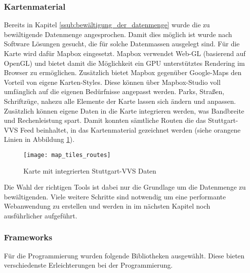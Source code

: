   \subsubsection{Kartenmaterial}
  \label{ssub:kartenmaterial}
    Bereits in Kapitel \ref{ssub:bewältigung_der_datenmenge} wurde die zu bewältigende Datenmenge angesprochen. Damit dies möglich ist wurde nach Software Lösungen gesucht, die für solche Datenmassen ausgelegt sind. Für die Karte wird dafür Mapbox eingesetzt. Mapbox verwendet Web-GL (basierend auf OpenGL) und bietet damit die Möglichkeit ein GPU unterstütztes Rendering im Browser zu ermöglichen. Zusätzlich bietet Mapbox gegenüber Google-Maps den Vorteil von eigene Karten-Styles. Diese können über Mapbox-Studio voll umfänglich auf die eigenen Bedürfnisse angepasst werden. Parks, Straßen, Schriftzüge, nahezu alle Elemente der Karte lassen sich ändern und anpassen. Zusätzlich können eigene Daten in die Karte integrieren werden, was Bandbreite und Rechenleistung spart. Damit konnten sämtliche Routen die das Stuttgart-VVS Feed beinhaltet, in das Kartenmaterial gezeichnet werden (siehe orangene Linien in Abbildung \ref{fig:map_tiles_routes}).

    \begin{figure}[htbp]
      \begin{center}
        \texttt{[image: map\_tiles\_routes]}
        \caption{Karte mit integrierten Stuttgart-VVS Daten}
        \label{fig:map_tiles_routes}
      \end{center}
    \end{figure}
    
    Die Wahl der richtigen Tools ist dabei nur die Grundlage um die Datenmenge zu bewältigenden. Viele weitere Schritte sind notwendig um eine performante Webanwendung zu erstellen und werden in im nächsten Kapitel  noch ausführlicher aufgeführt.
    

  \subsubsection{Frameworks}
  \label{ssub:frameworks}
    Für die Programmierung wurden folgende Bibliotheken ausgewählt. Diese bieten verschiedenste Erleichterungen bei der Programmierung.

